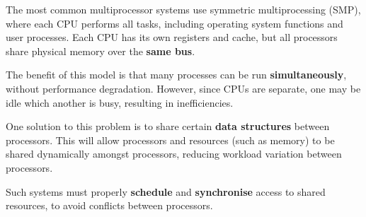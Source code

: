 \documentclass{article}
\begin{document}
\begin{tcolorboxlarge}[title={Symmetric Multiprocessing}, parbox=false]
    The most common multiprocessor systems use symmetric multiprocessing
    (SMP), where each CPU performs all tasks, including operating system
    functions and user processes. Each CPU has its own registers and
    cache, but all processors share physical memory over the
    \textbf{same bus}.

    The benefit of this model is that many processes can be run
    \textbf{simultaneously}, without performance degradation. However,
    since CPUs are separate, one may be idle which another is busy,
    resulting in inefficiencies.

    One solution to this problem is to share certain \textbf{data
    structures} between processors. This will allow processors and
    resources (such as memory) to be shared dynamically amongst
    processors, reducing workload variation between processors.

    Such systems must properly \textbf{schedule} and
    \textbf{synchronise} access to shared resources, to avoid conflicts
    between processors.
\end{tcolorboxlarge}
\end{document}
